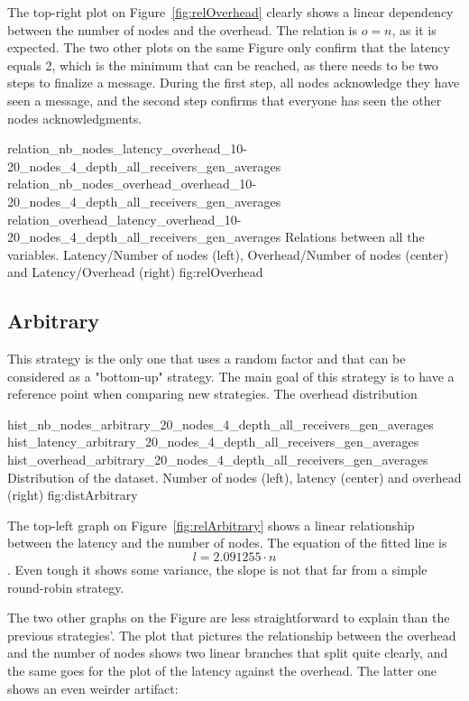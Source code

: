 The top-right plot on Figure~\ref{fig:relOverhead} clearly shows a linear
dependency between the number of nodes and the overhead. The relation is \(o =
n\), as it is expected.
The two other plots on the same Figure only confirm that the latency equals 2,
which is the minimum that can be reached, as there needs to be two steps to
finalize a message. During the first step, all nodes acknowledge they have seen
a message, and the second step confirms that everyone has seen the other nodes
acknowledgments.

\triplefigure
    {relation_nb_nodes_latency_overhead_10-20_nodes_4_depth_all_receivers_gen_averages}
    {relation_nb_nodes_overhead_overhead_10-20_nodes_4_depth_all_receivers_gen_averages}
    {relation_overhead_latency_overhead_10-20_nodes_4_depth_all_receivers_gen_averages}
    {Relations between all the variables. Latency/Number of nodes (left),
    Overhead/Number of nodes (center) and Latency/Overhead (right)}
    {fig:relOverhead}

\subsection{Arbitrary}
This strategy is the only one that uses a random factor and that can be
considered as a "bottom-up" strategy. The main goal of this strategy is to
have a reference point when comparing new strategies.
The overhead distribution 


\triplefigure
    {hist_nb_nodes_arbitrary_20_nodes_4_depth_all_receivers_gen_averages}
    {hist_latency_arbitrary_20_nodes_4_depth_all_receivers_gen_averages}
    {hist_overhead_arbitrary_20_nodes_4_depth_all_receivers_gen_averages}
    {Distribution of the dataset. Number of nodes (left), latency (center)
    and overhead (right)}
    {fig:distArbitrary}

The top-left graph on Figure~\ref{fig:relArbitrary} shows a linear relationship
between the latency and the number of nodes. The equation of the fitted line is
\[l = 2.091255 \cdot n\]. Even tough it shows some variance, the slope is
not that far from a simple round-robin strategy. 

The two other graphs on the Figure are less straightforward to explain than the
previous strategies'. The plot that pictures the relationship between the
overhead and the number of nodes shows two linear branches that split quite
clearly, and the same goes for the plot of the latency against the overhead.
The latter one shows an even weirder artifact: 




